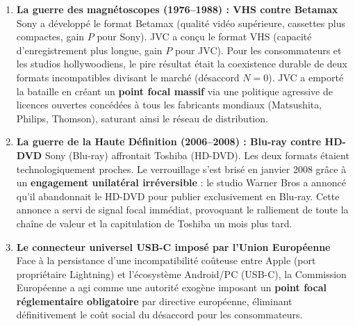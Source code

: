 \documentclass[11pt,a4paper]{article}
\begin{document}
\begin{enumerate}[label=(\alph*),leftmargin=1.5em]
    \item \textbf{La guerre des magnétoscopes (1976--1988) : VHS contre Betamax}
    Sony a développé le format Betamax (qualité vidéo supérieure, cassettes plus compactes, gain $P$ pour Sony). JVC a conçu le format VHS (capacité d'enregistrement plus longue, gain $P$ pour JVC).
    Pour les consommateurs et les studios hollywoodiens, le pire résultat était la coexistence durable de deux formats incompatibles divisant le marché (désaccord $N = 0$). 
    JVC a emporté la bataille en créant un \textbf{point focal massif} via une politique agressive de licences ouvertes concédées à tous les fabricants mondiaux (Matsushita, Philips, Thomson), saturant ainsi le réseau de distribution.
    
    \item \textbf{La guerre de la Haute Définition (2006--2008) : Blu-ray contre HD-DVD}
    Sony (Blu-ray) affrontait Toshiba (HD-DVD). Les deux formats étaient technologiquement proches. Le verrouillage s'est brisé en janvier 2008 grâce à un \textbf{engagement unilatéral irréversible} : le studio Warner Bros a annoncé qu'il abandonnait le HD-DVD pour publier exclusivement en Blu-ray. Cette annonce a servi de signal focal immédiat, provoquant le ralliement de toute la chaîne de valeur et la capitulation de Toshiba un mois plus tard.
    
    \item \textbf{Le connecteur universel USB-C imposé par l'Union Européenne}
    Face à la persistance d'une incompatibilité coûteuse entre Apple (port propriétaire Lightning) et l'écosystème Android/PC (USB-C), la Commission Européenne a agi comme une autorité exogène imposant un \textbf{point focal réglementaire obligatoire} par directive européenne, éliminant définitivement le coût social du désaccord pour les consommateurs.
\end{enumerate}
\end{document}
